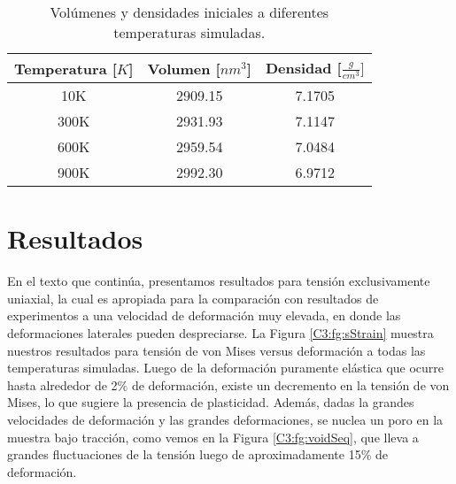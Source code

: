 
\begin{table}[htp]
\caption[Volúmenes y densidades iniciales.]{Volúmenes y densidades iniciales a diferentes temperaturas simuladas.}
\begin{center}
\begin{tabular}{*{3}{c}}
\hline
Temperatura [$K$] & Volumen [$nm^{3}$] & Densidad [$\frac{g}{cm^{3}}]$ \\ \hline \hline
10K & 2909.15 & 7.1705 \\ \hline
300K & 2931.93 & 7.1147 \\ \hline
600K & 2959.54 & 7.0484 \\ \hline
900K & 2992.30 & 6.9712 \\ \hline
\end{tabular}
\end{center}
\label{C3:tb:initprops}
\end{table}

\section{Resultados}

En el texto que continúa, presentamos resultados para tensión exclusivamente uniaxial, la cual es apropiada para la comparación con resultados de experimentos a una velocidad de deformación muy elevada, en donde las deformaciones laterales pueden despreciarse. La Figura \ref{C3:fg:sStrain}  muestra nuestros resultados para tensión de von Mises versus deformación a todas las temperaturas simuladas. Luego de la deformación puramente elástica que ocurre hasta alrededor de 2\% de deformación, existe un decremento en la tensión de von Mises, lo que sugiere la presencia de plasticidad. Además, dadas la grandes velocidades de deformación y las grandes deformaciones, se nuclea un poro en la muestra bajo tracción, como vemos en la Figura \ref{C3:fg:voidSeq}, que lleva a grandes fluctuaciones de la tensión luego de aproximadamente 15\% de deformación.

